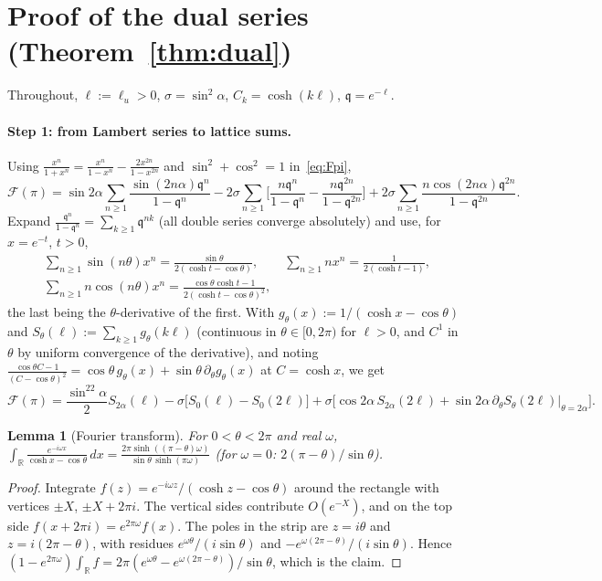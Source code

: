 \documentclass[11pt]{article}
\newtheorem{lemma}[theorem]{Lemma}
\theoremstyle{definition}
\theoremstyle{remark}
\begin{document}
\section{Proof of the dual series (Theorem~\ref{thm:dual})}\label{app:dual}
Throughout, $\ell:=\ell_u>0$, $\sigma=\sin^2\alpha$, $C_k=\cosh(k\ell)$, $\mathfrak q=e^{-\ell}$.

\paragraph{Step 1: from Lambert series to lattice sums.} Using $\frac{x^n}{1+x^n}=\frac{x^n}{1-x^n}-\frac{2x^{2n}}{1-x^{2n}}$ and
$\sin^2+\cos^2=1$ in~\eqref{eq:Fpi},
\[
\mathcal F(\pi)=\sin2\alpha\sum_{n\ge1}\frac{\sin(2n\alpha)\mathfrak q^n}{1-\mathfrak q^n}-2\sigma\sum_{n\ge1}\Big[\frac{n\mathfrak q^n}{1-\mathfrak q^n}-\frac{n\mathfrak q^{2n}}{1-\mathfrak q^{2n}}\Big]
+2\sigma\sum_{n\ge1}\frac{n\cos(2n\alpha)\mathfrak q^{2n}}{1-\mathfrak q^{2n}}.
\]
Expand $\frac{\mathfrak q^n}{1-\mathfrak q^n}=\sum_{k\ge1}\mathfrak q^{nk}$ (all double series converge absolutely) and use, for $x=e^{-t}$, $t>0$,
\begin{gather*}
\sum_{n\ge1}\sin(n\theta)x^n=\frac{\sin\theta}{2(\cosh t-\cos\theta)},\qquad
\sum_{n\ge1}nx^n=\frac1{2(\cosh t-1)},\\
\sum_{n\ge1}n\cos(n\theta)x^n=\frac{\cos\theta\cosh t-1}{2(\cosh t-\cos\theta)^2},
\end{gather*}
the last being the $\theta$-derivative of the first. With $g_\theta(x):=1/(\cosh x-\cos\theta)$ and $S_\theta(\ell):=\sum_{k\ge1}g_\theta(k\ell)$
(continuous in $\theta\in[0,2\pi)$ for $\ell>0$, and $C^1$ in $\theta$ by uniform convergence of the derivative), and noting
$\frac{\cos\theta C-1}{(C-\cos\theta)^2}=\cos\theta\,g_\theta(x)+\sin\theta\,\partial_\theta g_\theta(x)$ at $C=\cosh x$, we get
\begin{equation}\label{eq:FviaS}
\mathcal F(\pi)=\frac{\sin^22\alpha}2S_{2\alpha}(\ell)-\sigma\big[S_0(\ell)-S_0(2\ell)\big]+\sigma\big[\cos2\alpha\,S_{2\alpha}(2\ell)+\sin2\alpha\,\partial_\theta S_\theta(2\ell)|_{\theta=2\alpha}\big].
\end{equation}

\begin{lemma}[Fourier transform]\label{lem:FT}
For $0<\theta<2\pi$ and real $\omega$, $\displaystyle\int_{\mathbb R}\frac{e^{-i\omega x}}{\cosh x-\cos\theta}\,dx=\frac{2\pi\sinh((\pi-\theta)\omega)}{\sin\theta\,\sinh(\pi\omega)}$
(for $\omega=0$: $2(\pi-\theta)/\sin\theta$).
\end{lemma}
\begin{proof}
Integrate $f(z)=e^{-i\omega z}/(\cosh z-\cos\theta)$ around the rectangle with vertices $\pm X$, $\pm X+2\pi i$. The vertical sides
contribute $O(e^{-X})$, and on the top side $f(x+2\pi i)=e^{2\pi\omega}f(x)$. The poles in the strip are $z=i\theta$ and $z=i(2\pi-\theta)$,
with residues $e^{\omega\theta}/(i\sin\theta)$ and $-e^{\omega(2\pi-\theta)}/(i\sin\theta)$. Hence
$(1-e^{2\pi\omega})\int_{\mathbb R}f=2\pi(e^{\omega\theta}-e^{\omega(2\pi-\theta)})/\sin\theta$, which is the claim.
\end{proof}
\end{document}
